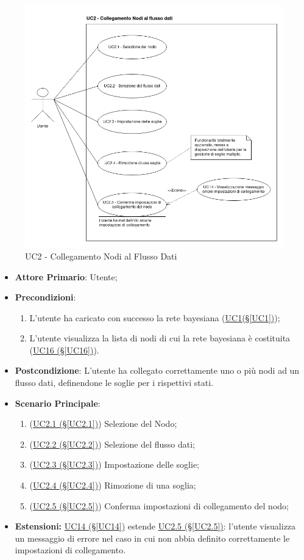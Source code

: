 \begin{figure}[H]
\centering
\includegraphics[scale=0.5]{./images/UC2.png}
\caption{UC2 - Collegamento Nodi al Flusso Dati}
\end{figure}

\begin{itemize}
\item \textbf{Attore Primario}: Utente;
\item \textbf{Precondizioni}: 
\begin{enumerate}
	\item L'utente ha caricato con successo la rete bayesiana (\hyperref[UC1]{UC1(§\ref*{UC1})});
	\item L'utente visualizza la lista di nodi di cui la rete bayesiana è costituita	(\hyperref[UC16]{UC16 (§\ref*{UC16})}).
\end{enumerate}
\item \textbf{Postcondizione}: L'utente ha collegato correttamente uno o più nodi ad un flusso dati, definendone le soglie per i rispettivi stati.	
\item \textbf{Scenario Principale}:
 \begin{enumerate}
 \item (\hyperref[UC2.1]{UC2.1 (§\ref*{UC2.1})}) Selezione del Nodo;
 \item (\hyperref[UC2.2]{UC2.2 (§\ref*{UC2.2})}) Selezione del flusso dati;
 \item (\hyperref[UC2.3]{UC2.3 (§\ref*{UC2.3})}) Impostazione delle soglie;
 \item (\hyperref[UC2.4]{UC2.4 (§\ref*{UC2.4})}) Rimozione di una soglia;
 \item (\hyperref[UC2.5]{UC2.5 (§\ref*{UC2.5})}) Conferma impostazioni di collegamento del nodo;
 \end{enumerate}
\item \textbf{Estensioni:} \hyperref[UC14]{UC14 (§\ref*{UC14})} estende \hyperref[UC2.5]{UC2.5 (§\ref*{UC2.5})}: l'utente visualizza un messaggio di errore nel caso in cui non abbia definito correttamente le impostazioni di collegamento.
\end{itemize}

